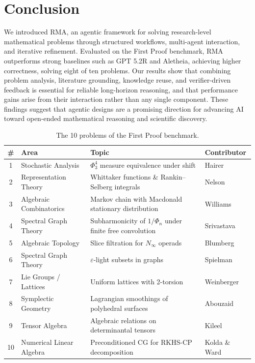 \documentclass{article}
\newcommand{\modelname}{\textsc{RMA}\xspace}
\begin{document}
\vspace{-5pt}
\section{Conclusion}
\label{sec:conclusion}
\vspace{-4pt}

We introduced \modelname, an agentic framework for solving research-level mathematical problems through structured workflows, multi-agent interaction, and iterative refinement. Evaluated on the First Proof benchmark, \modelname outperforms strong baselines such as GPT 5.2R and Aletheia, achieving higher correctness, solving eight of ten problems. Our results show that combining problem analysis, literature grounding, knowledge reuse, and verifier-driven feedback is essential for reliable long-horizon reasoning, and that performance gains arise from their interaction rather than any single component. These findings suggest that agentic designs are a promising direction for advancing AI toward open-ended mathematical reasoning and scientific discovery.

\newpage



\newpage
\appendix

\begin{table}[t]
  \caption{The 10 problems of the First Proof benchmark.}
  \label{tab-problems}
  \centering
  \small
  \begin{tabular}{clp{6.5cm}l}
    \toprule
    \# & Area & Topic & Contributor \\
    \midrule
    1 & Stochastic Analysis & $\Phi^4_3$ measure equivalence under shift & Hairer \\
    2 & Representation Theory & Whittaker functions \& Rankin--Selberg integrals & Nelson \\
    3 & Algebraic Combinatorics & Markov chain with Macdonald stationary distribution & Williams \\
    4 & Spectral Graph Theory & Subharmonicity of $1/\Phi_n$ under finite free convolution & Srivastava \\
    5 & Algebraic Topology & Slice filtration for $N_\infty$ operads & Blumberg \\
    6 & Spectral Graph Theory & $\varepsilon$-light subsets in graphs & Spielman \\
    7 & Lie Groups / Lattices & Uniform lattices with 2-torsion & Weinberger \\
    8 & Symplectic Geometry & Lagrangian smoothings of polyhedral surfaces & Abouzaid \\
    9 & Tensor Algebra & Algebraic relations on determinantal tensors & Kileel \\
    10 & Numerical Linear Algebra & Preconditioned CG for RKHS-CP decomposition & Kolda \& Ward \\
    \bottomrule
  \end{tabular}
\end{table}
\end{document}
